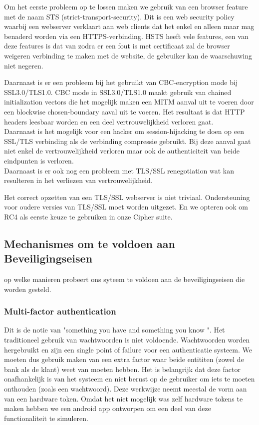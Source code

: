 \documentclass[11pt]{article}
\begin{document}
Om het eerste probleem op te lossen maken we gebruik van een browser feature met de naam STS (strict-transport-security). Dit is een web security policy waarbij een webserver verklaart aan web clients dat het enkel en alleen maar mag benaderd worden via een HTTPS-verbinding. HSTS heeft vele features, een van deze features is dat van zodra er een fout is met certificaat zal de browser weigeren verbinding te maken met de website, de gebruiker kan de waarschuwing niet negeren.

Daarnaast is er een probleem bij het gebruikt van CBC-encryption mode bij SSL3.0/TLS1.0. CBC mode in SSL3.0/TLS1.0 maakt gebruik van chained initialization vectors die het mogelijk maken een MITM aanval uit te voeren door een blockwise chosen-boundary aaval uit te voeren. Het resultaat is dat HTTP headers leesbaar worden en een deel vertrouwelijkheid verloren gaat.\cite{BEAST} \\

Daarnaast is het mogelijk voor een hacker om session-hijacking te doen op een SSL/TLS verbinding als de verbinding compressie gebruikt. Bij deze aanval gaat niet enkel de vertrouwelijkheid verloren maar ook de authenticiteit van beide eindpunten is verloren. \cite{CRIME}\\

Daarnaast is er ook nog een probleem met TLS/SSL renegotiation wat kan resulteren in het verliezen van vertrouwelijkheid. \cite{reg}

Het correct opzetten van een TLS/SSL webserver is niet triviaal. Ondersteuning voor oudere versies van TLS/SSL moet worden uitgezet. En we opteren ook om RC4 als eerste keuze te gebruiken in onze Cipher suite.
\subsection{Mechanismes om te voldoen aan Beveiligingseisen}
op welke manieren probeert ons syteem te voldoen aan de beveiligingseisen die worden gesteld.

\subsubsection{Multi-factor authentication}
Dit is de notie van "something you have and something you know ". 
\cite{multi_f}
Het traditioneel gebruik van wachtwoorden is niet voldoende. Wachtwoorden worden hergebruikt en zijn een single point of failure voor een authenticatie systeem. We moeten dus gebruik maken van een extra factor waar beide entititen (zowel de bank als de klant) weet van moeten hebben. Het is belangrijk dat deze factor onafhankelijk is van het systeem en niet berust op de gebruiker om iets te moeten onthouden (zoals een wachtwoord). Deze werkwijze neemt meestal de vorm aan van een hardware token. Omdat het niet mogelijk was zelf hardware tokens te maken hebben we een android app ontworpen om een deel van deze functionaliteit te simuleren.
\end{document}
